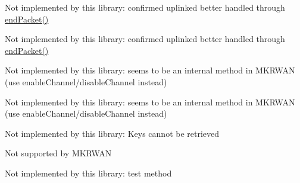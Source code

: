 \begin{DoxyRefList}
\item[Member \mbox{\hyperlink{classSTM32LoRaWAN_a1b8fbaeab4917b93e3f240133835d3e3}{S\+T\+M32\+Lo\+Ra\+W\+AN::get\+C\+FM}} ()]\label{extensions__extensions000026}%
%
 Not implemented by this library\+: confirmed uplinked better handled through \mbox{\hyperlink{classSTM32LoRaWAN_a816dd9c8b223bda9380971c5a1dab377}{end\+Packet()}}  
\item[Member \mbox{\hyperlink{classSTM32LoRaWAN_a58632ff20ab6a0f48fa772c827d73cde}{S\+T\+M32\+Lo\+Ra\+W\+AN::get\+C\+FS}} ()]\label{extensions__extensions000027}%
%
 Not implemented by this library\+: confirmed uplinked better handled through \mbox{\hyperlink{classSTM32LoRaWAN_a816dd9c8b223bda9380971c5a1dab377}{end\+Packet()}}  
\item[Member \mbox{\hyperlink{classSTM32LoRaWAN_a87dedb0a627b82dcf7bba62edbea3713}{S\+T\+M32\+Lo\+Ra\+W\+AN::get\+Channel\+Mask}} ()]\label{extensions__extensions000047}%
%
 Not implemented by this library\+: seems to be an internal method in M\+K\+R\+W\+AN (use enable\+Channel/disable\+Channel instead)  
\item[Member \mbox{\hyperlink{classSTM32LoRaWAN_a067096f42efcee590a3b0c807a65e07f}{S\+T\+M32\+Lo\+Ra\+W\+AN::get\+Channel\+Mask\+Size}} (\+\_\+lora\+\_\+band band)]\label{extensions__extensions000048}%
%
 Not implemented by this library\+: seems to be an internal method in M\+K\+R\+W\+AN (use enable\+Channel/disable\+Channel instead)  
\item[Member \mbox{\hyperlink{classSTM32LoRaWAN_a190e38032336a2d69927724fbe872f17}{S\+T\+M32\+Lo\+Ra\+W\+AN::get\+Nwk\+S\+Key}} ()]\label{extensions__extensions000042}%
%
 Not implemented by this library\+: Keys cannot be retrieved  
\item[Member \mbox{\hyperlink{classSTM32LoRaWAN_a01ff41259ed00ec882e33eb0e33b72c2}{S\+T\+M32\+Lo\+Ra\+W\+AN::get\+Port}} ()]\label{extensions__extensions000013}%
%
 Not supported by M\+K\+R\+W\+AN  
\item[Member \mbox{\hyperlink{classSTM32LoRaWAN_a5c4031e2de24b5f3066603e71e37a2ae}{S\+T\+M32\+Lo\+Ra\+W\+AN::get\+T\+Conf}} ()]\label{extensions__extensions000031}%
%
 Not implemented by this library\+: test method  
\item[Member \mbox{\hyperlink{classSTM32LoRaWAN_ac49cddab0119f98ae926e53aa11e16f2}{S\+T\+M32\+Lo\+Ra\+W\+AN::init}} ()]\label{extensions__extensions000040}%

\end{DoxyRefList}
